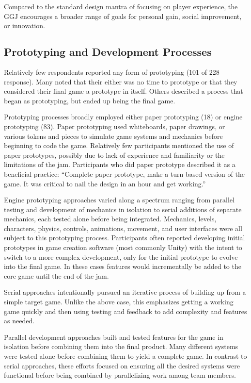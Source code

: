 \documentclass{sig-alternate}
\begin{document}
Compared to the standard design mantra of focusing on player experience, the GGJ encourages a broader range of goals for personal gain, social improvement, or innovation. 


\subsection{Prototyping and Development Processes}
Relatively few respondents reported any form of prototyping (101 of 228 response). Many noted that their either was no time to prototype or that they considered their final game a prototype in itself. Others described a process that began as prototyping, but ended up being the final game.

Prototyping processes broadly employed either paper prototyping (18) or engine prototyping (83).
Paper prototyping used whiteboards, paper drawings, or various tokens and pieces to simulate game systems and mechanics before beginning to code the game. Relatively few participants mentioned the use of paper prototypes, possibly due to lack of experience and familiarity or the limitations of the jam. Participants who did paper prototype described it as a beneficial practice:
``Complete paper prototype, make a turn-based version of the game. It was critical to nail the design in an hour and get working.''

Engine prototyping approaches varied along a spectrum ranging from parallel testing and development of mechanics in isolation to serial additions of separate mechanics, each tested alone before being integrated. Mechanics, levels, characters, physics, controls, animations, movement, and user interfaces were all subject to this prototyping process. 
Participants often reported developing initial prototypes in game creation software (most commonly Unity) with the intent to switch to a more complex development, only for the initial prototype to evolve into the final game. In these cases features would incrementally be added to the core game until the end of the jam.

Serial approaches intentionally pursued an iterative process of building up from a simple target game. Unlike the above case, this emphasizes getting a working game quickly and then using testing and feedback to add complexity and features as needed.

Parallel development approaches built and tested features for the game in isolation before combining them into the final product. Many different systems were tested alone before combining them to yield a complete game. In contrast to serial approaches, these efforts focused on ensuring all the desired systems were functional before being combined by parallelizing work among team members.
\end{document}
